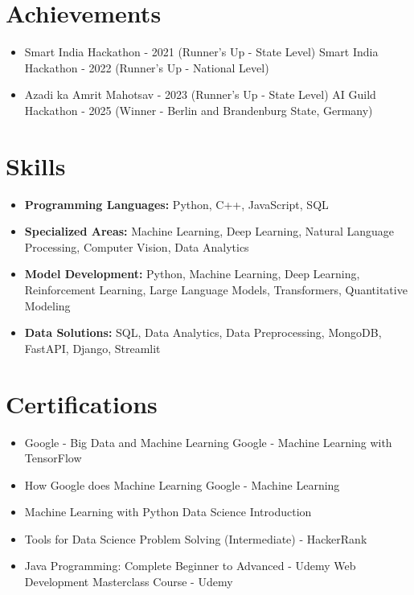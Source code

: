 \documentclass[a4paper,10pt]{article}
\begin{document}
\section*{Achievements}
\begin{itemize}
\item Smart India Hackathon - 2021 (Runner's Up - State Level) \hfill Smart India Hackathon - 2022 (Runner's Up - National Level)
\item Azadi ka Amrit Mahotsav - 2023 (Runner's Up - State Level) \hfill AI Guild Hackathon - 2025 (Winner - Berlin and Brandenburg State, Germany)
\end{itemize}

\section*{Skills}
\begin{itemize}
  \item \textbf{Programming Languages:} Python, C++, JavaScript, SQL
  \item \textbf{Specialized Areas:} Machine Learning, Deep Learning, Natural Language Processing, Computer Vision, Data Analytics
  \item \textbf{Model Development:} Python, Machine Learning, Deep Learning, Reinforcement Learning, Large Language Models, Transformers, Quantitative Modeling
  \item \textbf{Data Solutions:} SQL, Data Analytics, Data Preprocessing, MongoDB, FastAPI, Django, Streamlit
\end{itemize}

\section*{Certifications}
\begin{itemize}
\item Google - Big Data and Machine Learning \hfill Google - Machine Learning with TensorFlow
\item How Google does Machine Learning \hfill Google - Machine Learning
\item Machine Learning with Python \hfill Data Science Introduction
\item Tools for Data Science \hfill Problem Solving (Intermediate) - HackerRank
\item Java Programming: Complete Beginner to Advanced - Udemy \hfill Web Development Masterclass Course - Udemy
\end{itemize}
\end{document}
